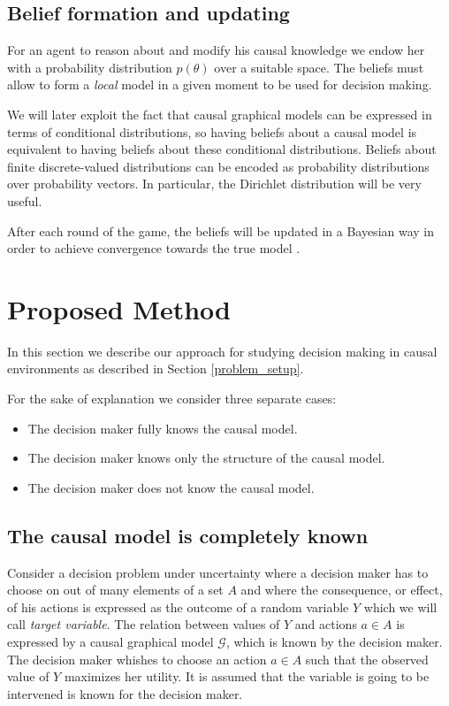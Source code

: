 \documentclass{article}
\begin{document}
\subsection{Belief formation and updating}
For an agent to reason about and modify his causal knowledge we endow her with a probability distribution $p(\theta)$ over a suitable space. The beliefs must allow to form a \textit{local} model in a given moment to be used for decision making.

We will later exploit the fact that causal graphical models can be expressed in terms of conditional distributions, so having beliefs about a causal model is equivalent to having beliefs about these conditional distributions. Beliefs about finite discrete-valued distributions can be encoded as probability distributions over probability vectors. In particular, the Dirichlet distribution will be very useful.

After each round of the game, the beliefs will be updated in a Bayesian way in order to achieve convergence towards the true model \cite{shoham2008multiagent}.

\section{Proposed Method}
In this section we describe our approach for studying decision making in causal environments as described in Section \ref{problem_setup}.

For the sake of explanation we consider three separate cases:

\begin{itemize}
\item The decision maker fully knows the causal model.
\item The decision maker knows only the structure of the causal model.
\item The decision maker does not know the causal model.
\end{itemize}

\subsection{The causal model is completely known}
Consider a decision problem under uncertainty where a decision maker has to choose on out of many elements of a set $A$ and where the consequence, or effect, of his actions is expressed as the outcome of a random variable $Y$ which we will call \textit{target variable}. The relation between values of $Y$ and actions $a \in A$ is expressed by a causal graphical model $\mathcal{G}$, which is known by the decision maker. The decision maker whishes to choose an action $a \in A$ such that the observed value of $Y$ maximizes her utility. It is assumed that the variable is going to be intervened is known for the decision maker.
\end{document}
